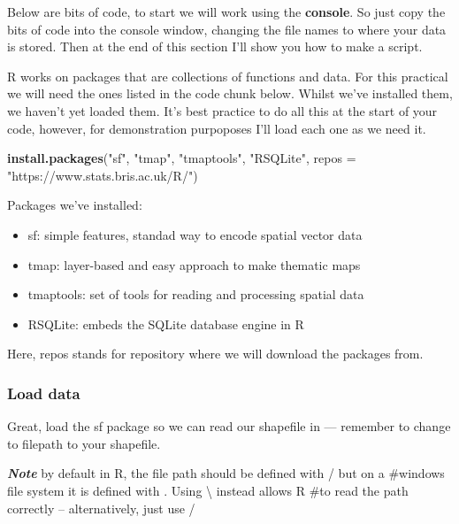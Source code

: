 \documentclass[]{book}
\newenvironment{Shaded}{\begin{snugshade}}{\end{snugshade}}
\newcommand{\DataTypeTok}[1]{\textcolor[rgb]{0.13,0.29,0.53}{#1}}
\newcommand{\KeywordTok}[1]{\textcolor[rgb]{0.13,0.29,0.53}{\textbf{#1}}}
\newcommand{\NormalTok}[1]{#1}
\newcommand{\StringTok}[1]{\textcolor[rgb]{0.31,0.60,0.02}{#1}}
\providecommand{\tightlist}{%
  \setlength{\itemsep}{0pt}\setlength{\parskip}{0pt}}
\begin{document}
Below are bits of code, to start we will work using the \textbf{console}. So just copy the bits of code into the console window, changing the file names to where your data is stored. Then at the end of this section I'll show you how to make a script.

R works on packages that are collections of functions and data. For this practical we will need the ones listed in the code chunk below. Whilst we've installed them, we haven't yet loaded them. It's best practice to do all this at the start of your code, however, for demonstration purpoposes I'll load each one as we need it.

\begin{Shaded}
\begin{Highlighting}[]
\KeywordTok{install.packages}\NormalTok{(}\StringTok{"sf"}\NormalTok{, }\StringTok{"tmap"}\NormalTok{, }\StringTok{"tmaptools"}\NormalTok{, }\StringTok{"RSQLite"}\NormalTok{, }\DataTypeTok{repos =} \StringTok{"https://www.stats.bris.ac.uk/R/"}\NormalTok{)}
\end{Highlighting}
\end{Shaded}

Packages we've installed:

\begin{itemize}
\tightlist
\item
  sf: simple features, standad way to encode spatial vector data
\item
  tmap: layer-based and easy approach to make thematic maps
\item
  tmaptools: set of tools for reading and processing spatial data
\item
  RSQLite: embeds the SQLite database engine in R
\end{itemize}

Here, repos stands for repository where we will download the packages from.

\hypertarget{load-data-2}{%
\subsubsection{Load data}\label{load-data-2}}

Great, load the sf package so we can read our shapefile in --- remember to change to filepath to your shapefile.

\textbf{\emph{Note}} by default in R, the file path should be defined with / but on a \#windows file system it is defined with . Using \textbackslash{} instead allows R \#to read the path correctly -- alternatively, just use /
\end{document}

